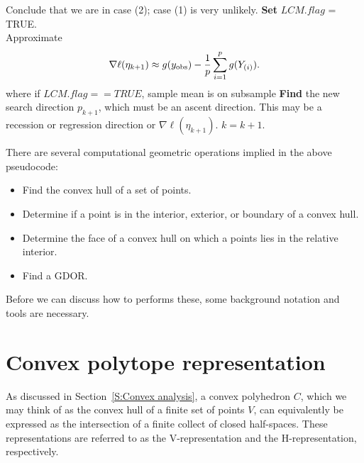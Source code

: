 {\begin{algorithmic}[1]
			\State Conclude that we are in case (2); case (1) is very unlikely.
			\State \textbf{Set} $LCM.flag$ = TRUE.
		\EndIf
	\EndIf
\EndIf\\
	\State Approximate 
	\begin{align} \label{E:nabla ell approx LCM}
	\nabla \ell( \eta_{k+1}) \approx g(y_{\text{obs}}) - \frac{1}{p}\sum_{i=1}^p g(Y_{(i)}).
	\end{align}
	\State where if $LCM.flag == TRUE$, sample mean is on subsample
\State \textbf{Find} the new search direction $p_{k+1}$, which must be an ascent 
direction.
\State This may be a recession or regression direction or $\nabla \ell( \eta_{k+1})$.
\State $k = k + 1$.
\EndWhile
\end{algorithmic}
}

There are several computational geometric operations implied in the above pseudocode:
\begin{itemize}
\item Find the convex hull of a set of points.
\item Determine if a point is in the interior, exterior, or  boundary of a convex hull.
\item Determine the face of a convex hull on which a points lies in the relative interior.
\item Find a GDOR.
\end{itemize}

Before we can discuss how to performs these, some background notation
and tools are necessary.

\section{Convex polytope representation}
As discussed in Section~\ref{S:Convex analysis}, a convex polyhedron $C$, which we 
may think of as the convex hull of a finite set of points $V$, can equivalently
be expressed as the intersection of a finite collect of closed half-spaces.  These
representations are referred to as the V-representation and the H-representation, 
respectively.

